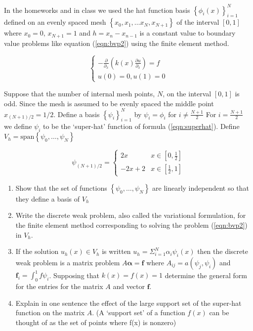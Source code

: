 
In the homeworks and in class we used the hat function basis $\left\{ \phi_{i}(x) \right\}_{i=1}^{N}$ defined on an evenly
spaced mesh $\left\{  x_0, x_1, \ldots x_N, x_{N+1}  \right\}$ of the interval $[0,1]$ where $x_0=0$, $x_{N+1}=1$ and $h = x_n - x_{n-1}$ is a constant value to boundary value problems like equation (\ref{eqn:bvp2}) using the finite element method. 
 
\begin{equation}\label{eqn:bvp2}
 \left\{
     \begin{array}{c}
       -\frac{\partial}{\partial_x}\left( k(x) \frac{\partial u}{\partial_x}\right) = f\\
       u(0) = 0, u(1) = 0
     \end{array}
   \right.
\end{equation}

Suppose that the number of internal mesh points, $N$, on the interval $[0,1]$ is odd.  Since the mesh is assumed to be evenly spaced the middle point $x_{ (N+1)/2} = 1/2$. Define a basis $\left\{ \psi_{i} \right\}_{i=1}^{N}$ by $\psi_{i} = \phi_{i}$ for $i \neq \frac{N+1}{2}$  For $i = \frac{N+1}{2}$ we define $\psi_{i}$ to be the `super-hat' function of formula (\ref{eqn:superhat}).  Define $V_{h} = \text{span}\left\{\psi_{0},\ldots,\psi_{N}\right\}$


\begin{equation}\label{eqn:superhat}
\psi_{(N+1)/2} = 
\left\{
     \begin{array}{cc}
       2x       & x \in [0,\frac12]\\ %
      -2x+2  & x\in [\frac12,1] %
     \end{array}
   \right.
\end{equation}



\begin{enumerate}
\item Show that the set of functions $\left\{\psi_{0},\ldots,\psi_{N}\right\}$ are linearly independent so that they define a basis of $V_{h}$

\item Write the discrete weak problem, also called the variational formulation, for the finite element method corresponding to solving the problem (\ref{eqn:bvp2}) in $V_{h}$.

\item If the solution $u_h(x) \in V_h$ is written $u_h = \Sigma_{i=1}^{N} \alpha_{i}\psi_{i}(x)$ then the discrete weak problem is a matrix problem $A\mathbf{\alpha} = \mathbf{f}$ where $A_{ij} = a(\psi_j,\psi_i)$ and $\mathbf{f}_i = \int_{0}^{1}  f \psi_i$.  Supposing that $k(x) = f(x) = 1$ determine the general form for the entries for the matrix $A$ and vector $\mathbf{f}$.
\item Explain in one sentence the effect of the large support set of the super-hat function on the matrix $A$. (A `support set' of a function $f(x)$ can be thought of as the set of points where f(x) is nonzero)
\end{enumerate}


